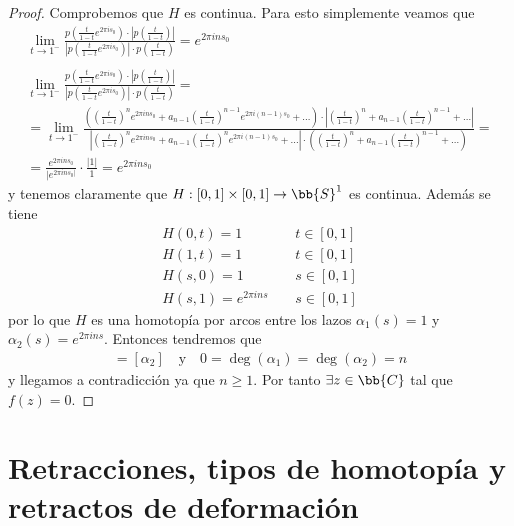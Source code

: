 \begin{teo}
\begin{proof}
        Comprobemos que $H$ es continua. Para esto simplemente veamos que 
        \begin{gather*}
            \lim_{t\to 1^-}\frac{p\left(\frac{t}{1-t} e^{2\pi i s_0}\right) \cdot \left|p\left(\frac{t}{1-t}\right)\right|}{\left|p\left(\frac{t}{1-t} e^{2\pi i s_0}\right)\right| \cdot p\left(\frac{t}{1-t}\right)} = e^{2 \pi i n s_0}\\\\
            \lim_{t\to 1^-}\frac{p\left(\frac{t}{1-t} e^{2\pi i s_0}\right) \cdot \left|p\left(\frac{t}{1-t}\right)\right|}{\left|p\left(\frac{t}{1-t} e^{2\pi i s_0}\right)\right| \cdot p\left(\frac{t}{1-t}\right)} =\\
            = \lim_{t\to 1^-} \frac{\left(\left(\frac{t}{1-t}\right)^n e^{2\pi i n s_0} + a_{n-1} \left(\frac{t}{1-t}\right)^{n-1} e^{2\pi i (n-1) s_0} + \dots\right) \cdot \left|\left(\frac{t}{1-t}\right)^n + a_{n-1} \left(\frac{t}{1-t}\right)^{n-1}  + \dots\right|  }%
            {\left|\left(\frac{t}{1-t}\right)^n e^{2\pi i n s_0} + a_{n-1} \left(\frac{t}{1-t}\right)^n e^{2\pi i (n-1) s_0} + \dots\right| \cdot \left(\left(\frac{t}{1-t}\right)^n + a_{n-1} \left(\frac{t}{1-t}\right)^{n-1}  + \dots\right)} = \\
            = \frac{e^{2\pi i n s_0}}{|e^{2\pi i n s_0|}} \cdot \frac{|1|}{1} = e^{2\pi i n s_0}
        \end{gather*}
        y tenemos claramente que $H:[0,1]\times [0,1]\to \bb{S}^1$ es continua. Además se tiene 
        \begin{align*}
            H(0,t) = 1\ \ \ \ \ & t\in [0,1]\\
            H(1,t) = 1\ \ \ \ \  & t\in [0,1]\\
            H(s,0) = 1\ \ \ \ \  & s\in [0,1]\\
            H(s,1) = e^{2\pi i n s} \ \ \ \ \ & s\in [0,1]
        \end{align*}
        por lo que $H$ es una homotopía por arcos entre los lazos $\alpha_1(s) = 1$ y $\alpha_2(s) = e^{2\pi i n s}$. Entonces tendremos que 
        \begin{gather*}
            [\alpha_1] = [\alpha_2] \ \ \ \text{ y } \ \ \ 0 = \deg(\alpha_1) = \deg(\alpha_2) = n
        \end{gather*}
        y llegamos a contradicción ya que $n\geq 1$. Por tanto $\exists z \in \bb{C}$ tal que $f(z) = 0$.
    \end{proof}
\end{teo}

\section{Retracciones, tipos de homotopía y retractos de deformación}

